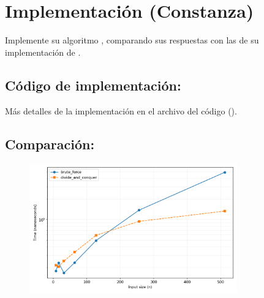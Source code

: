 \documentclass[main.tex]{subfiles}
\begin{document}
\section{Implementación (Constanza)}

Implemente su algoritmo , comparando sus respuestas con las de su
implementación de .


\subsection{Código de implementación:}


\vspace{1em}

Más detalles de la implementación en el archivo del código ().


\subsection{Comparación:}
\begin{figure}[h] \centering \includegraphics[width=0.8\textwidth]{img/plot_bf_dv.png}
\end{figure}
\end{document}
